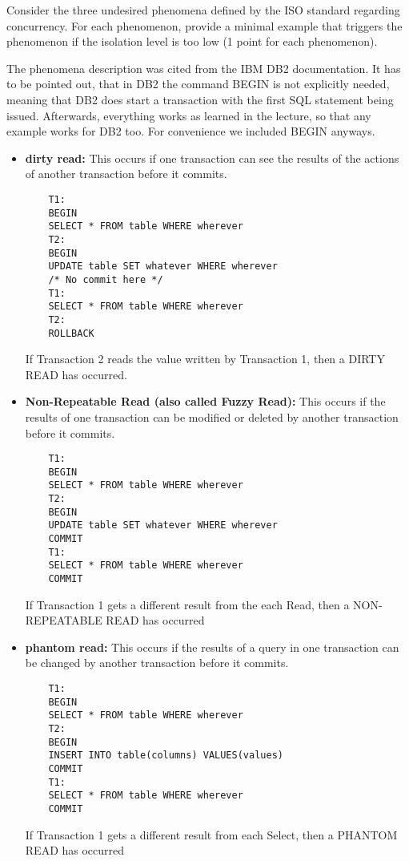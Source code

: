 \documentclass{vldb}
\begin{document}
Consider the three undesired phenomena defined by the ISO standard regarding concurrency. For each phenomenon, provide a minimal example that triggers the phenomenon if the isolation level is too low (1 point for each phenomenon).

The phenomena description was cited from the IBM DB2 documentation. It has to be pointed out, that in DB2 the command BEGIN is not explicitly needed, meaning that DB2 does start a transaction with the first SQL statement being issued. Afterwards, everything works as learned in the lecture, so that any example works for DB2 too. For convenience we included BEGIN anyways.

\begin{itemize}
	\item \textbf{dirty read:} This occurs if one transaction can see the results of the actions of another transaction before it commits.
	\begin{verbatim}
	T1:
	BEGIN
	SELECT * FROM table WHERE wherever
	T2:
	BEGIN
	UPDATE table SET whatever WHERE wherever
	/* No commit here */
	T1:
	SELECT * FROM table WHERE wherever
	T2:
	ROLLBACK
	\end{verbatim}
	If Transaction 2 reads the value written by Transaction 1, then a DIRTY READ has occurred.
	\item \textbf{Non-Repeatable Read (also called Fuzzy Read):} This occurs if the results of one transaction can be modified or deleted by another transaction before it commits.
	\begin{verbatim}
	T1:
	BEGIN
	SELECT * FROM table WHERE wherever
	T2:
	BEGIN
	UPDATE table SET whatever WHERE wherever
	COMMIT
	T1:
	SELECT * FROM table WHERE wherever
	COMMIT
	\end{verbatim}
	If Transaction 1 gets a different result from the each Read, then a NON-REPEATABLE READ has occurred
	\item \textbf{phantom read:} This occurs if the results of a query in one transaction can be changed by another transaction before it commits.
	\begin{verbatim}
	T1:
	BEGIN
	SELECT * FROM table WHERE wherever
	T2:
	BEGIN
	INSERT INTO table(columns) VALUES(values)
	COMMIT
	T1:
	SELECT * FROM table WHERE wherever
	COMMIT
	\end{verbatim}
	If Transaction 1 gets a different result from each Select, then a PHANTOM READ has occurred 
\end{itemize}
\end{document}
